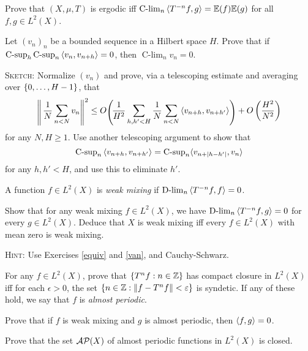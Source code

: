 \documentclass[reqno, twoside]{article}
\newcommand{\Clim}{\operatorname{C-lim}}
\newcommand{\Csup}{\operatorname{C-sup}}
\newcommand{\Dlim}{\operatorname{D-lim}}
\begin{document}
    \begin{exercise}
        Prove that $(X,\mu,T)$ is ergodic iff $\Clim_n\l\langle T^{-n}f,g\r\rangle=\E(f)\E(g)$ for all $f,g\in L^2(X)$.
    \end{exercise}

    \begin{exercise}\label{van}
        Let $(v_n)_n$ be a bounded sequence in a Hilbert space $H$. Prove that if $\Csup_h\Csup_n\l\langle v_n,v_{n+h}\r\rangle=0$, then $\Clim_nv_n=0$.

        \textsc{Sketch}: Normalize $(v_n)$ and prove, via a telescoping estimate and averaging over $\left\{0,\dots,H-1\right\}$, that
        \vspace{-0.05in}
        \begin{equation*}
            \raisebox{-2pt}{$\Biggl\|\,$}\frac{1}{N}\sum_{n<N}v_n\raisebox{-2pt}{$\Biggr\|$}^2\leq O\raisebox{-2pt}{$\Biggl(\!$}\frac{1}{H^2}\sum_{h,h'<H}\frac{1}{N}\sum_{n<N}\l\langle v_{n+h},v_{n+h'}\r\rangle\!\raisebox{-2pt}{$\Biggr)$}+O\l(\frac{H^2}{N^2}\r)
            \vspace{-0.05in}
        \end{equation*}
        for any $N,H\geq1$. Use another telescoping argument to show that
        \vspace{-0.05in}
        \begin{equation*}
            \Csup_n\l\langle v_{n+h},v_{n+h'}\r\rangle=\Csup_n\langle v_{n+|h-h'|},v_n\rangle
            \vspace{-0.05in}
        \end{equation*}
        for any $h,h'<H$, and use this to eliminate $h'$.
    \end{exercise}

    \begin{definition*}
        A function $f\in L^2(X)$ is \textit{weak mixing} if $\Dlim_n\l\langle T^{-n}f,f\r\rangle=0$.
    \end{definition*}

    \begin{exercise}
        Show that for any weak mixing $f\in L^2(X)$, we have $\Dlim_n\l\langle T^{-n}f,g\r\rangle=0$ for every $g\in L^2(X)$. Deduce that $X$ is weak mixing iff every $f\in L^2(X)$ with mean zero is weak mixing.

        \textsc{Hint:} Use Exercises \ref{equiv} and \ref{van}, and Cauchy-Schwarz.
    \end{exercise}

    \begin{exercise}
        For any $f\in L^2(X)$, prove that $\left\{T^nf: n\in\mathbb{Z}\right\}$ has compact closure in $L^2(X)$ iff for each $\epsilon>0$, the set $\left\{n\in\mathbb{Z}:\left\|f-T^nf\right\|<\varepsilon\right\}$ is syndetic. If any of these hold, we say that $f$ is \textit{almost periodic}.
    \end{exercise}

    \begin{exercise}
        Prove that if $f$ is weak mixing and $g$ is almost periodic, then $\left\langle f,g\right\rangle=0$.
    \end{exercise}

    \begin{exercise}
        Prove that the set $\mathcal{AP}(X)$ of almost periodic functions in $L^2(X)$ is closed.
    \end{exercise}
\end{document}
